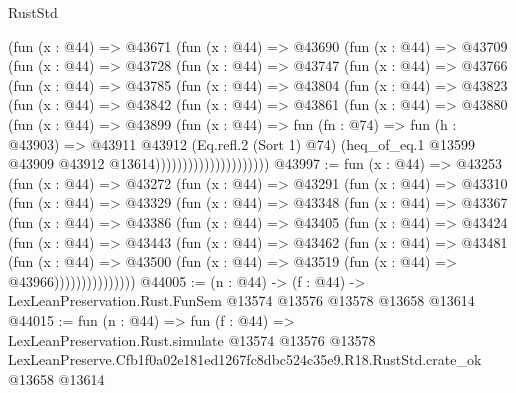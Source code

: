 \begin{lexlean}{RustStd}
\begin{coremodule}
                (fun (x : @44) =>
                @43671
                  (fun (x : @44) =>
                  @43690
                    (fun (x : @44) =>
                    @43709
                      (fun (x : @44) =>
                      @43728
                        (fun (x : @44) =>
                        @43747
                          (fun (x : @44) =>
                          @43766
                            (fun (x : @44) =>
                            @43785
                              (fun (x : @44) =>
                              @43804
                                (fun (x : @44) =>
                                @43823
                                  (fun (x : @44) =>
                                  @43842
                                    (fun (x : @44) =>
                                    @43861
                                      (fun (x : @44) =>
                                      @43880
                                        (fun (x : @44) =>
                                        @43899
                                          (fun (x : @44) =>
                                          fun (fn : @74) =>
                                          fun (h : @43903) =>
                                          @43911
                                            @43912
                                            (Eq.refl.{2} (Sort 1) @74)
                                            (heq_of_eq.{1}
                                              @13599
                                              @43909
                                              @43912
                                              @13614)))))))))))))))))))))
@43997 := fun (x : @44) =>
  @43253
    (fun (x : @44) =>
    @43272
      (fun (x : @44) =>
      @43291
        (fun (x : @44) =>
        @43310
          (fun (x : @44) =>
          @43329
            (fun (x : @44) =>
            @43348
              (fun (x : @44) =>
              @43367
                (fun (x : @44) =>
                @43386
                  (fun (x : @44) =>
                  @43405
                    (fun (x : @44) =>
                    @43424
                      (fun (x : @44) =>
                      @43443
                        (fun (x : @44) =>
                        @43462
                          (fun (x : @44) =>
                          @43481
                            (fun (x : @44) =>
                            @43500 (fun (x : @44) => @43519 (fun (x : @44) => @43966)))))))))))))))
@44005 := (n : @44) ->
  (f : @44) -> LexLeanPreservation.Rust.FunSem @13574 @13576 @13578 @13658 @13614
@44015 := fun (n : @44) =>
  fun (f : @44) =>
  LexLeanPreservation.Rust.simulate
    @13574
    @13576
    @13578
    LexLeanPreserve.Cfb1f0a02e181ed1267fc8dbc524c35e9.R18.RustStd.crate_ok
    @13658
    @13614
\end{coremodule}
\end{lexlean}
